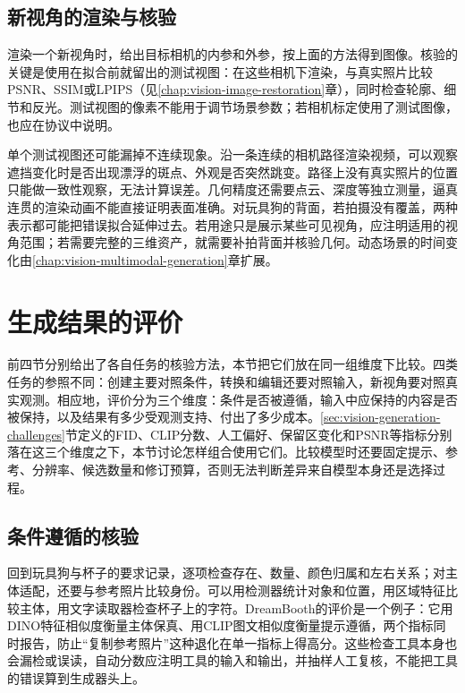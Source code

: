\subsection{新视角的渲染与核验}
\label{sec:vision-generation-rendering-check}

渲染一个新视角时，给出目标相机的内参和外参，按上面的方法得到图像。核验的关键是使用在拟合前就留出的测试视图：在这些相机下渲染，与真实照片比较PSNR、SSIM或LPIPS（见\ref{chap:vision-image-restoration}章），同时检查轮廓、细节和反光。测试视图的像素不能用于调节场景参数；若相机标定使用了测试图像，也应在协议中说明。

单个测试视图还可能漏掉不连续现象。沿一条连续的相机路径渲染视频，可以观察遮挡变化时是否出现漂浮的斑点、外观是否突然跳变。路径上没有真实照片的位置只能做一致性观察，无法计算误差。几何精度还需要点云、深度等独立测量，逼真连贯的渲染动画不能直接证明表面准确。对玩具狗的背面，若拍摄没有覆盖，两种表示都可能把错误拟合延伸过去。若用途只是展示某些可见视角，应注明适用的视角范围；若需要完整的三维资产，就需要补拍背面并核验几何。动态场景的时间变化由\ref{chap:vision-multimodal-generation}章扩展。

\section{生成结果的评价}
\label{sec:vision-generation-evaluation}

前四节分别给出了各自任务的核验方法，本节把它们放在同一组维度下比较。四类任务的参照不同：创建主要对照条件，转换和编辑还要对照输入，新视角要对照真实观测。相应地，评价分为三个维度：条件是否被遵循，输入中应保持的内容是否被保持，以及结果有多少受观测支持、付出了多少成本。\ref{sec:vision-generation-challenges}节定义的FID、CLIP分数、人工偏好、保留区变化和PSNR等指标分别落在这三个维度之下，本节讨论怎样组合使用它们。比较模型时还要固定提示、参考、分辨率、候选数量和修订预算，否则无法判断差异来自模型本身还是选择过程。

\subsection{条件遵循的核验}
\label{sec:vision-generation-condition-check}

回到玩具狗与杯子的要求记录，逐项检查存在、数量、颜色归属和左右关系；对主体适配，还要与参考照片比较身份。可以用检测器统计对象和位置，用区域特征比较主体，用文字读取器检查杯子上的字符。DreamBooth的评价是一个例子：它用DINO特征相似度衡量主体保真、用CLIP图文相似度衡量提示遵循，两个指标同时报告，防止“复制参考照片”这种退化在单一指标上得高分。这些检查工具本身也会漏检或误读，自动分数应注明工具的输入和输出，并抽样人工复核，不能把工具的错误算到生成器头上。

